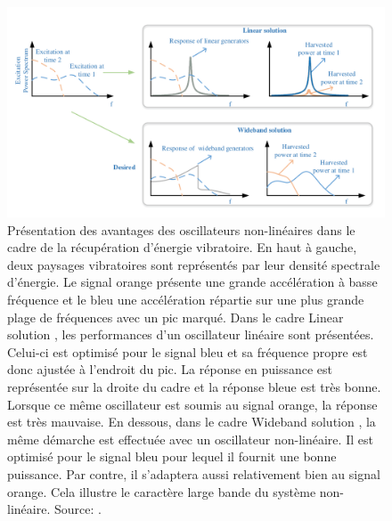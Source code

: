 \documentclass[a4paper, french, 12pt, titlepage]{article}
\begin{document}
\begin{figure}
  \begin{center}
    \includegraphics[width = .8\textwidth]{images/weiqun_lui_harvester2}
  \end{center}
  \caption{Présentation des avantages des oscillateurs non-linéaires dans le cadre de la récupération d'énergie vibratoire.
    En haut à gauche, deux paysages vibratoires sont représentés par leur densité spectrale d'énergie.
    Le signal orange présente une grande accélération à basse fréquence et le bleu une accélération répartie sur une plus grande plage de fréquences avec un pic marqué.
    Dans le cadre \og Linear solution \fg, les performances d'un oscillateur linéaire sont présentées.
    Celui-ci est optimisé pour le signal bleu et sa fréquence propre est donc ajustée à l'endroit du pic.
    La réponse en puissance est représentée sur la droite du cadre et la réponse bleue est très bonne.
    Lorsque ce même oscillateur est soumis au signal orange, la réponse est très mauvaise.
    En dessous, dans le cadre \og Wideband solution \fg, la même démarche est effectuée avec un oscillateur non-linéaire.
    Il est optimisé pour le signal bleu pour lequel il fournit une bonne puissance.
    Par contre, il s'adaptera aussi relativement bien au signal orange.
    Cela illustre le caractère large bande du système non-linéaire.  Source:  \cite{Liu2014}.}
  \label{fig:wl_wideband}
\end{figure}
\end{document}
